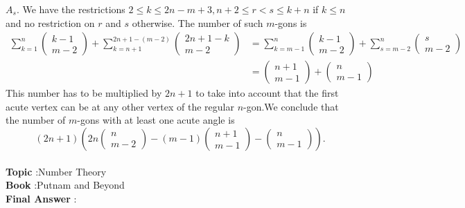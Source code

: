 \documentclass[10pt]{article}
\begin{document}
$A_{s}$. We have the restrictions $2 \leq k \leq 2 n-m+3, n+2 \leq r<s \leq k+n$ if $k \leq n$ and no restriction on $r$ and $s$ otherwise. The number of such $m$-gons is$$ \begin{aligned} \sum_{k=1}^{n}\left(\begin{array}{c} k-1 \\ m-2 \end{array}\right)+\sum_{k=n+1}^{2 n+1-(m-2)}\left(\begin{array}{c} 2 n+1-k \\ m-2 \end{array}\right) &=\sum_{k=m-1}^{n}\left(\begin{array}{c} k-1 \\ m-2 \end{array}\right)+\sum_{s=m-2}^{n}\left(\begin{array}{c} s \\ m-2 \end{array}\right) \\ &=\left(\begin{array}{c} n+1 \\ m-1 \end{array}\right)+\left(\begin{array}{c} n \\ m-1 \end{array}\right) \end{aligned} $$This number has to be multiplied by $2 n+1$ to take into account that the first acute vertex can be at any other vertex of the regular $n$-gon.We conclude that the number of $m$-gons with at least one acute angle is$$ (2 n+1)\left(2 n\left(\begin{array}{c} n \\ m-2 \end{array}\right)-(m-1)\left(\begin{array}{c} n+1 \\ m-1 \end{array}\right)-\left(\begin{array}{c} n \\ m-1 \end{array}\right)\right) . $$\\
\textbf{Topic} :Number Theory\\
\textbf{Book} :Putnam and Beyond\\
\textbf{Final Answer} :\\
\end{document}
